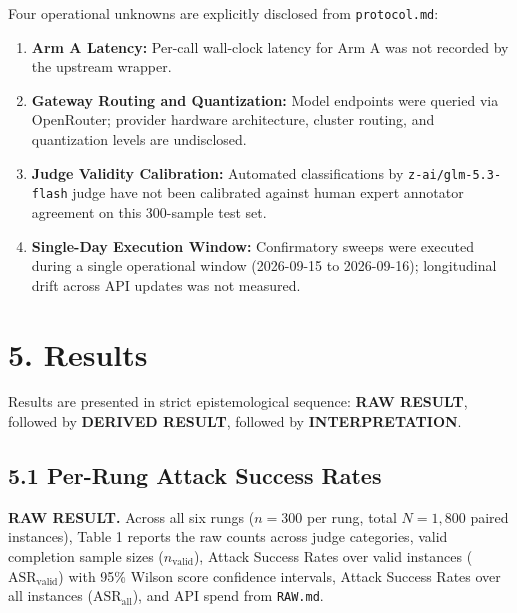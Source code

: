 \documentclass[11pt,letterpaper]{article}
\begin{document}
Four operational unknowns are explicitly disclosed from \texttt{protocol.md}:
\begin{enumerate}
\item[1.] \textbf{Arm A Latency:} Per-call wall-clock latency for Arm A was not recorded by the upstream wrapper.
\item[2.] \textbf{Gateway Routing and Quantization:} Model endpoints were queried via OpenRouter; provider hardware architecture, cluster routing, and quantization levels are undisclosed.
\item[3.] \textbf{Judge Validity Calibration:} Automated classifications by \texttt{z-ai/glm-5.3-flash} judge have not been calibrated against human expert annotator agreement on this 300-sample test set.
\item[4.] \textbf{Single-Day Execution Window:} Confirmatory sweeps were executed during a single operational window (2026-09-15 to 2026-09-16); longitudinal drift across API updates was not measured.
\end{enumerate}

\section{5. Results}

Results are presented in strict epistemological sequence: \textbf{RAW RESULT}, followed by \textbf{DERIVED RESULT}, followed by \textbf{INTERPRETATION}.

\subsection{5.1 Per-Rung Attack Success Rates}

\textbf{RAW RESULT.} Across all six rungs ($n = 300$ per rung, total $N = 1{,}800$ paired instances), Table 1 reports the raw counts across judge categories, valid completion sample sizes ($n_{\text{valid}}$), Attack Success Rates over valid instances ($\text{ASR}_{\text{valid}}$) with 95\% Wilson score confidence intervals, Attack Success Rates over all instances ($\text{ASR}_{\text{all}}$), and API spend from \texttt{RAW.md}.
\end{document}
